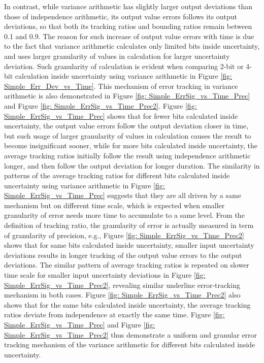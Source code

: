 \documentclass[twoside]{article}
\numberwithin{equation}{section}
\begin{document}
In contrast, while variance arithmetic has slightly larger output deviations than those of independence arithmetic, its output value errors follows its output deviations, so that both its tracking ratios and bounding ratios remain between 0.1 and 0.9.  The reason for such increase of output value errors with time is due to the fact that variance arithmetic calculates only limited bits inside uncertainty, and uses larger granularity of values in calculation for larger uncertainty deviation. Such granularity of calculation is evident when comparing 2-bit or 4-bit calculation inside uncertainty using variance arithmetic in Figure \ref{fig: Simple_Err_Dev_vs_Time}.  This mechanism of error tracking in variance arithmetic is also demonstrated in Figure \ref{fig: Simple_ErrSig_vs_Time_Prec} and Figure \ref{fig: Simple_ErrSig_vs_Time_Prec2}.  Figure \ref{fig: Simple_ErrSig_vs_Time_Prec} shows that for fewer bits calculated inside uncertainty, the output value errors follow the output deviation closer in time, but such usage of larger granularity of values in calculation causes the result to become insignificant sooner, while for more bits calculated inside uncertainty, the average tracking ratios initially follow the result using independence arithmetic longer, and then follow the output deviation for longer duration.  The similarity in patterns of the average tracking ratios for different bits calculated inside uncertainty using variance arithmetic in Figure \ref{fig: Simple_ErrSig_vs_Time_Prec} suggests that they are all driven by a same mechanism but on different time scale, which is expected when smaller granularity of error needs more time to accumulate to a same level.  From the definition of tracking ratio, the granularity of error is actually measured in term of granularity of precision, e.g., Figure \ref{fig: Simple_ErrSig_vs_Time_Prec2} shows that for same bits calculated inside uncertainty, smaller input uncertainty deviations results in longer tracking of the output value errors to the output deviations.  The similar pattern of average tracking ratios is repeated on slower time scale for smaller input uncertainty deviations in Figure \ref{fig: Simple_ErrSig_vs_Time_Prec2}, revealing similar underline error-tracking mechanism in both cases.  Figure \ref{fig: Simple_ErrSig_vs_Time_Prec2} also shows that for the same bits calculated inside uncertainty, the average tracking ratios deviate from independence at exactly the same time.  Figure \ref{fig: Simple_ErrSig_vs_Time_Prec} and Figure \ref{fig: Simple_ErrSig_vs_Time_Prec2} thus demonstrate a uniform and granular error tracking mechanism of the variance arithmetic for different bits calculated inside uncertainty.  
\end{document}
